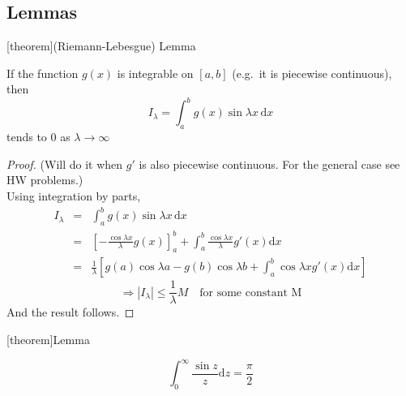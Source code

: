 \documentclass[12pt]{report}
\theoremstyle{definition}
\begin{document}
\subsection{Lemmas}
[theorem]{(Riemann-Lebesgue) Lemma}
\begin{Riemann-lebesgue}
    If the function $g(x)$ is integrable on $[a,b]$ (e.g.\ it is piecewise continuous), then\[
        I_\lambda = \int_{a}^{b} g(x) \sin{\lambda x}\,\mathrm{d}x
    \] tends to 0 as $\lambda \rightarrow \infty$
\end{Riemann-lebesgue}
\begin{proof}
    (Will do it when $g'$ is also piecewise continuous. For the general case see HW problems.)
    \\Using integration by parts,
    \begin{eqnarray*}
        I_\lambda &=& \int_{a}^{b} g(x)\sin{\lambda x} \,\mathrm{d}x \\
                  &=& {\left[-\frac{\cos{\lambda x}}{\lambda}g(x)\right]}_a^{b}
                  + \int_{a}^{b} \frac{\cos{\lambda x}}{\lambda}g'(x) \mathrm{d}x \\
                  &=& \frac{1}{\lambda}\left[g(a)\cos{\lambda a} - g(b)\cos{\lambda b} 
                  + \int_{a}^{b} \cos{\lambda x} g'(x) \mathrm{d}x\right] 
    \end{eqnarray*}
    \[
        \Rightarrow |I_\lambda | \le \frac{1}{\lambda}M \quad 
        \text{for some constant M}
    \]
    And the result follows.
\end{proof}
[theorem]{Lemma}
\begin{Lemma 2}
    \[
        \int_{0}^{\infty} \frac{\sin{z}}{z}\mathrm{d}z = \frac{\pi}{2}
    \]
\end{Lemma 2}
\end{document}
